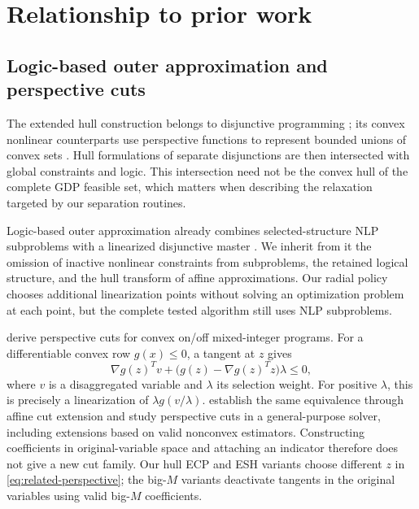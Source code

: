 \section{Relationship to prior work}\label{sec:related}
\subsection{Logic-based outer approximation and perspective cuts}
The extended hull construction belongs to disjunctive programming \citep{balas1998}; its convex nonlinear counterparts use perspective functions to represent bounded unions of convex sets \citep{ceria1999,grossmann2003}. Hull formulations of separate disjunctions are then intersected with global constraints and logic. This intersection need not be the convex hull of the complete GDP feasible set, which matters when describing the relaxation targeted by our separation routines.

Logic-based outer approximation already combines selected-structure NLP subproblems with a linearized disjunctive master \citep{turkay1996}. We inherit from it the omission of inactive nonlinear constraints from subproblems, the retained logical structure, and the hull transform of affine approximations. Our radial policy chooses additional linearization points without solving an optimization problem at each point, but the complete tested algorithm still uses NLP subproblems.

\citet{frangioni2006} derive perspective cuts for convex on/off mixed-integer programs. For a differentiable convex row $g(x)\leq0$, a tangent at $z$ gives
\begin{equation}\label{eq:related-perspective}
 \nabla g(z)^T v+
 \bigl(g(z)-\nabla g(z)^Tz\bigr)\lambda\leq0,
\end{equation}
where $v$ is a disaggregated variable and $\lambda$ its selection weight. For positive $\lambda$, this is precisely a linearization of $\lambda g(v/\lambda)$. \citet{bestuzheva2023} establish the same equivalence through affine cut extension and study perspective cuts in a general-purpose solver, including extensions based on valid nonconvex estimators. Constructing coefficients in original-variable space and attaching an indicator therefore does not give a new cut family. Our hull ECP and ESH variants choose different $z$ in \eqref{eq:related-perspective}; the big-$M$ variants deactivate tangents in the original variables using valid big-$M$ coefficients.

